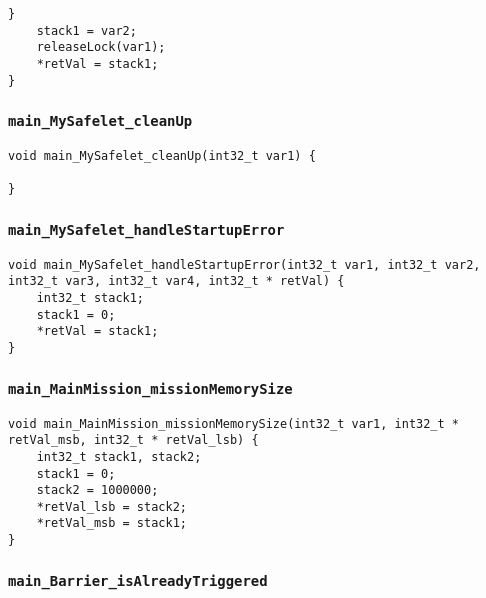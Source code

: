 \begin{landscape}
\begin{multicols}{2}
\begin{lstlisting}[firstnumber=472]
	}
	stack1 = var2;
	releaseLock(var1);
	*retVal = stack1;
}
\end{lstlisting}

\subsubsection{\texttt{main\_MySafelet\_cleanUp}}

\begin{lstlisting}[firstnumber=658]
void main_MySafelet_cleanUp(int32_t var1) {
	
}
\end{lstlisting}

\subsubsection{\texttt{main\_MySafelet\_handleStartupError}}

\begin{lstlisting}[firstnumber=1183]
void main_MySafelet_handleStartupError(int32_t var1, int32_t var2, int32_t var3, int32_t var4, int32_t * retVal) {
	int32_t stack1;
	stack1 = 0;
	*retVal = stack1;
}
\end{lstlisting}

\subsubsection{\texttt{main\_MainMission\_missionMemorySize}}

\begin{lstlisting}[firstnumber=1262]
void main_MainMission_missionMemorySize(int32_t var1, int32_t * retVal_msb, int32_t * retVal_lsb) {
	int32_t stack1, stack2;
	stack1 = 0;
	stack2 = 1000000;
	*retVal_lsb = stack2;
	*retVal_msb = stack1;
}  
\end{lstlisting}

\subsubsection{\texttt{main\_Barrier\_isAlreadyTriggered}}


\end{multicols}
\end{landscape}
